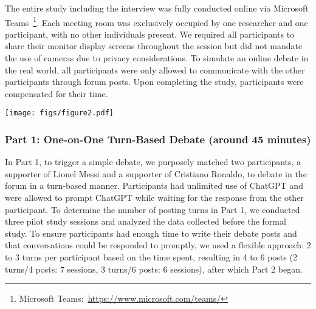 The entire study including the interview was fully conducted online via Microsoft Teams~\footnote{Microsoft Teams:~\url{https://www.microsoft.com/teams/}}. Each meeting room was exclusively occupied by one researcher and one participant, with no other individuals present. We required all participants to share their monitor display screens throughout the session but did not mandate the use of cameras due to privacy considerations. To simulate an online debate in the real world, all participants were only allowed to communicate with the other participants through forum posts. Upon completing the study, participants were compensated for their time.

\begin{figure*}
    \centering
    \texttt{[image: figs/figure2.pdf]}
    \caption{The study consists of two parts: Part 1: One-on-One Turn-Based Debate and Part 2: Three-Person Free Debate. In Part 1, two participants, Alice and Bob, with opposing stances, engaged in a turn-based debate. In Part 2, a third participant, Carol, who shares the same stance as one of the original participants, joined the ongoing debate. Image credit: ESPN FC.}
    \label{fig2}
\end{figure*}

\subsubsection{Part 1: One-on-One Turn-Based Debate (around 45 minutes)}

In Part 1, to trigger a simple debate, we purposely matched two participants, a supporter of Lionel Messi and a supporter of Cristiano Ronaldo, to debate in the forum in a turn-based manner. Participants had unlimited use of ChatGPT and were allowed to prompt ChatGPT while waiting for the response from the other participant. To determine the number of posting turns in Part 1, we conducted three pilot study sessions and analyzed the data collected before the formal study. To ensure participants had enough time to write their debate posts and that conversations could be responded to promptly, we used a flexible approach: 2 to 3 turns per participant based on the time spent, resulting in 4 to 6 posts (2 turns/4 posts: 7 sessions, 3 turns/6 posts: 6 sessions), after which Part 2 began.


